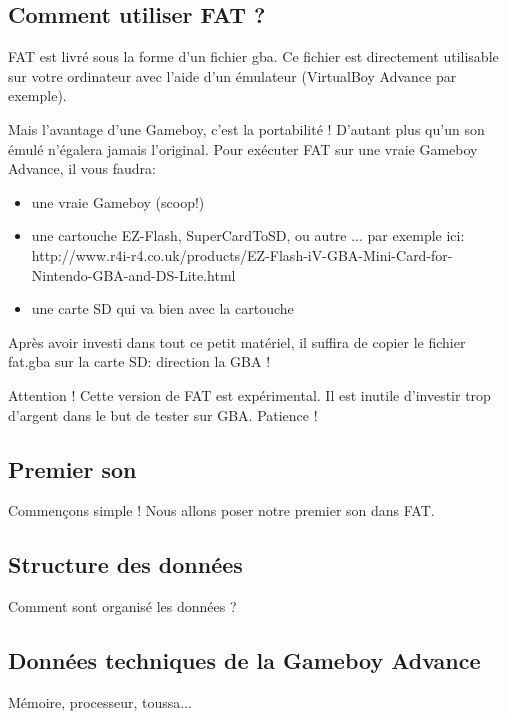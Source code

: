 \documentclass[12pt,a4paper]{article}
\begin{document}
    
    \subsection{Comment utiliser FAT ?}

    FAT est livré sous la forme d'un fichier gba. Ce fichier est directement utilisable sur votre ordinateur avec l'aide d'un émulateur (VirtualBoy Advance par exemple).\medskip
    
    Mais l'avantage d'une Gameboy, c'est la portabilité ! D'autant plus qu'un son émulé n'égalera jamais l'original. Pour exécuter FAT sur une vraie Gameboy Advance, il vous faudra:
    \begin{itemize}
        \item{une vraie Gameboy (scoop!)}
        \item{une cartouche EZ-Flash, SuperCardToSD, ou autre ... par exemple ici: http://www.r4i-r4.co.uk/products/EZ-Flash-iV-GBA-Mini-Card-for-Nintendo-GBA-and-DS-Lite.html}
        \item{une carte SD qui va bien avec la cartouche}
    \end{itemize}\medskip
    
    Après avoir investi dans tout ce petit matériel, il suffira de copier le fichier fat.gba sur la carte SD: direction la GBA !\medskip
    
    Attention ! Cette version de FAT est expérimental. Il est inutile d'investir trop d'argent dans le but de tester sur GBA. Patience !  
    
    \subsection{Premier son}

    Commençons simple ! Nous allons poser notre premier son dans FAT.
    
    \subsection{Structure des données}
    
    Comment sont organisé les données ?
    
    \subsection{Données techniques de la Gameboy Advance}
    
    Mémoire, processeur, toussa...
    
\end{document}

